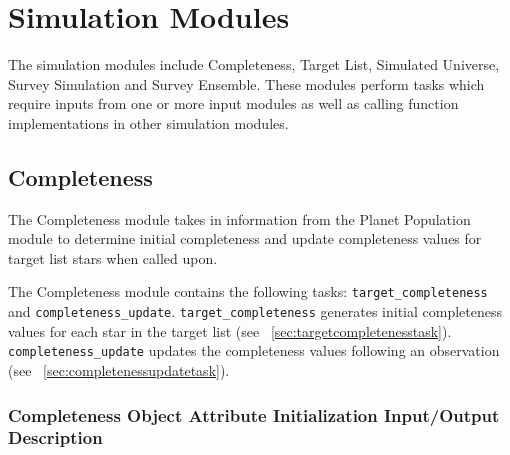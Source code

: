 \documentclass[cleanfoot]{asme2ej}
\begin{document}

\section{Simulation Modules}
The simulation modules include Completeness, Target List, Simulated Universe, Survey Simulation and Survey Ensemble. These modules perform tasks which require inputs from one or more input modules as well as calling function implementations in other simulation modules.


\subsection{Completeness}\label{sec:completeness}
The Completeness module takes in information from the Planet Population module to determine initial completeness and update completeness values for target list stars when called upon.

The Completeness module contains the following tasks: \verb+target_completeness+ and \verb+completeness_update+. \verb+target_completeness+ generates initial completeness values for each star in the target list (see ~\ref{sec:targetcompletenesstask}). \verb+completeness_update+ updates the completeness values following an observation (see ~\ref{sec:completenessupdatetask}).

\subsubsection{Completeness Object Attribute Initialization Input/Output Description}
\end{document}
